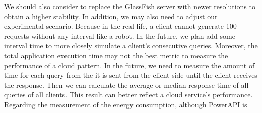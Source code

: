\documentclass{article}
\begin{document}
We should also consider to replace the GlassFish server with newer resolutions to obtain a higher stability. In addition, we may also need to adjust our experimental scenario. Because in the real-life, a client cannot generate 100 requests without any interval like a robot. In the future, we plan add some interval time to more closely simulate a client's consecutive queries. Moreover, the total application execution time may not the best metric to measure the performance of a cloud pattern. In the future, we need to measure the amount of time for each query from the it is sent from the client side until the client receives the response. Then we can calculate the average or median response time of all queries of all clients. This result can better reflect a cloud service's performance. Regarding the measurement of the energy consumption, although PowerAPI is 



\end{document}
